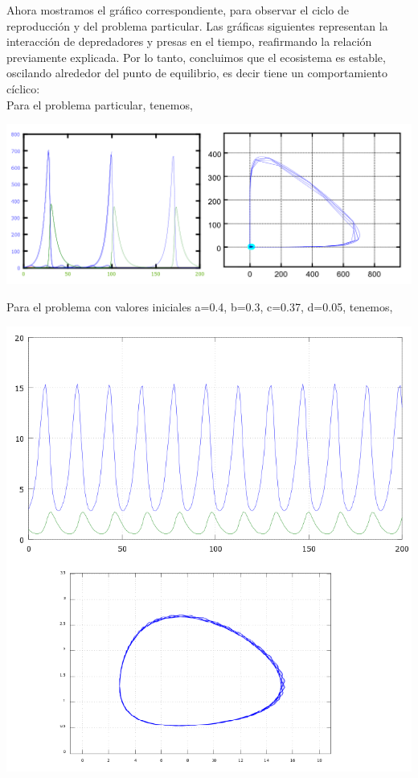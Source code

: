 \documentclass[10pt,letterpaper]{article}
\begin{document}
Ahora mostramos el gráfico correspondiente, para observar el ciclo de reproducción y del problema particular. Las gráficas siguientes representan la interacción de depredadores y presas en el tiempo, reafirmando la relación previamente explicada. Por lo tanto, concluimos que el ecosistema es estable, oscilando alrededor del punto de equilibrio, es decir tiene un comportamiento cíclico:\\

Para el problema particular, tenemos,\\
 \begin{center}
 \includegraphics[scale=0.5]{Pic/DPf1}
 \end{center}
\pagebreak
Para el problema con valores iniciales a=0.4, b=0.3, c=0.37, d=0.05, tenemos,\\
\begin{center}
	\includegraphics[scale=0.5]{Pic/DPf3}
\end{center}
\end{document}
